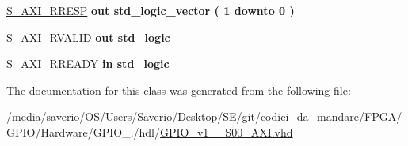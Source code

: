 \begin{DoxyCompactItemize}
\item 
\mbox{\label{classGPIO__v1__0__S00__AXI_a67ba85504b4c51fb0eb00d18fd70ad92}} 
\hyperlink{classGPIO__v1__0__S00__AXI_a67ba85504b4c51fb0eb00d18fd70ad92}{S\+\_\+\+A\+X\+I\+\_\+\+R\+R\+E\+SP}  {\bfseries {\bfseries \textcolor{vhdlchar}{out}\textcolor{vhdlchar}{ }}} {\bfseries \textcolor{vhdlchar}{std\+\_\+logic\+\_\+vector}\textcolor{vhdlchar}{ }\textcolor{vhdlchar}{(}\textcolor{vhdlchar}{ }\textcolor{vhdlchar}{ } \textcolor{vhdldigit}{1} \textcolor{vhdlchar}{ }\textcolor{vhdlchar}{downto}\textcolor{vhdlchar}{ }\textcolor{vhdlchar}{ } \textcolor{vhdldigit}{0} \textcolor{vhdlchar}{ }\textcolor{vhdlchar}{)}\textcolor{vhdlchar}{ }} 
\item 
\mbox{\label{classGPIO__v1__0__S00__AXI_a31f4e92d27c2c2005ee5f368a8249604}} 
\hyperlink{classGPIO__v1__0__S00__AXI_a31f4e92d27c2c2005ee5f368a8249604}{S\+\_\+\+A\+X\+I\+\_\+\+R\+V\+A\+L\+ID}  {\bfseries {\bfseries \textcolor{vhdlchar}{out}\textcolor{vhdlchar}{ }}} {\bfseries \textcolor{vhdlchar}{std\+\_\+logic}\textcolor{vhdlchar}{ }} 
\item 
\mbox{\label{classGPIO__v1__0__S00__AXI_a5850bf8f42acdf01938057507dc703b7}} 
\hyperlink{classGPIO__v1__0__S00__AXI_a5850bf8f42acdf01938057507dc703b7}{S\+\_\+\+A\+X\+I\+\_\+\+R\+R\+E\+A\+DY}  {\bfseries {\bfseries \textcolor{vhdlchar}{in}\textcolor{vhdlchar}{ }}} {\bfseries \textcolor{vhdlchar}{std\+\_\+logic}\textcolor{vhdlchar}{ }} 
\end{DoxyCompactItemize}


The documentation for this class was generated from the following file\+:\begin{DoxyCompactItemize}
\item 
/media/saverio/\+O\+S/\+Users/\+Saverio/\+Desktop/\+S\+E/git/codici\+\_\+da\+\_\+mandare/\+F\+P\+G\+A/\+G\+P\+I\+O/\+Hardware/\+G\+P\+I\+O\+\_./hdl/\hyperlink{GPIO__v1__0__S00__AXI_8vhd}{G\+P\+I\+O\+\_\+v1\+\_\+\_\+\+S00\+\_\+\+A\+X\+I.\+vhd}\end{DoxyCompactItemize}
